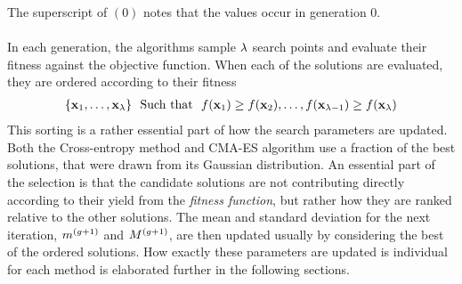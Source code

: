 The superscript of $(0)$ notes that the values occur in generation 0.\\
\\
In each generation, the algorithms sample $\lambda$ search points
and evaluate their fitness
against the objective function. When each of the solutions are evaluated,
they are ordered according to their fitness
\begin{align}
\{\textbf{\individual }_{1}, \hdots, 
\textbf{\individual }_{\populationSize }\}\ \ \text{Such that}\ \ 
\fitnessFunction(\textbf{x}_1) \geq 
\fitnessFunction(\textbf{\individual }_2), \hdots, 
\fitnessFunction(\textbf{\individual }_{\populationSize  - 1}) \geq 
\fitnessFunction(\textbf{\individual }_{\populationSize })
\end{align}
This sorting is a rather essential part of how the search parameters are
updated. Both the Cross-entropy method and CMA-ES algorithm use a fraction of the 
best solutions, that were drawn from its Gaussian distribution. An essential 
part of the selection is that the candidate solutions are not contributing
directly according to their yield from the \textit{fitness function}, but rather
how they are ranked relative to the other solutions.
The mean and standard deviation for the next iteration,
$m^{(g+1)}$ and $M^{(g+1)}$, are
then updated usually by considering the best of the ordered solutions. How exactly
these parameters are updated is individual for each method is elaborated further in the
following sections.


